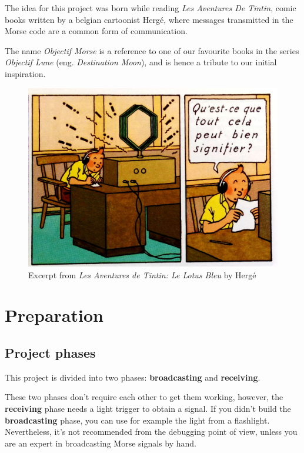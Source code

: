 \documentclass[12pt]{report}
\begin{document}
The idea for this project was born while reading \textit{Les Aventures De Tintin}, comic books written by a belgian cartoonist Hergé, where messages transmitted in the Morse code are a common form of communication. 

The name \textit{Objectif Morse} is a reference to one of our favourite books in the series \textit{Objectif Lune} \cite{objectif_lune} (eng. \textit{Destination Moon}), and is hence a tribute to our initial inspiration.

\begin{figure}[H]
\centering\includegraphics[scale=0.1]{le_lotus_bleu}
\caption{Excerpt from \textit{Les Aventures de Tintin: Le Lotus Bleu} by Hergé \cite{le_lotus_bleu}}			
\label{fig:tintin}
\end{figure}

\section{Preparation} \label{sec:equip}

\subsection{Project phases}

This project is divided into two phases: \textbf{broadcasting} and \textbf{receiving}. 

These two phases don't require each other to get them working, however, the \textbf{receiving} phase needs a light trigger to obtain a signal. If you didn't build the  \textbf{broadcasting} phase, you can use for example the light from a flashlight. Nevertheless, it's not recommended from the debugging point of view, unless you are an expert in broadcasting Morse signals by hand.
\end{document}
